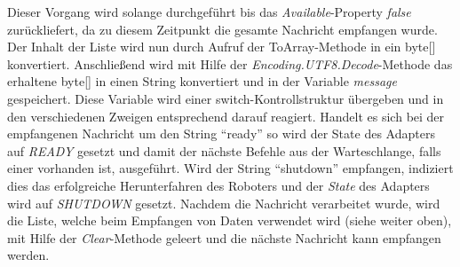 \begin{itemize}
Dieser Vorgang wird solange durchgeführt bis das \textit{Available}-Property \textit{false} zurückliefert, da zu diesem Zeitpunkt die gesamte Nachricht empfangen wurde. Der Inhalt der Liste wird nun durch Aufruf der ToArray-Methode in ein byte[] konvertiert.
\newline
Anschließend wird mit Hilfe der \textit{Encoding.UTF8.Decode}-Methode das erhaltene byte[] in einen String konvertiert und in der Variable \textit{message} gespeichert.
Diese Variable wird einer switch-Kontrollstruktur übergeben und in den verschiedenen Zweigen entsprechend darauf reagiert. 
Handelt es sich bei der empfangenen Nachricht um den String “ready” so wird der State des Adapters auf \textit{READY} gesetzt und damit der nächste Befehle aus der Warteschlange, falls einer vorhanden ist, ausgeführt.
Wird der String “shutdown” empfangen, indiziert dies das erfolgreiche Herunterfahren des Roboters und der \textit{State} des Adapters wird auf \textit{SHUTDOWN} gesetzt. Nachdem die Nachricht verarbeitet wurde, wird die Liste, welche beim Empfangen von Daten verwendet wird (siehe weiter oben), mit Hilfe der \textit{Clear}-Methode geleert und die nächste Nachricht kann empfangen werden.
\end{itemize}